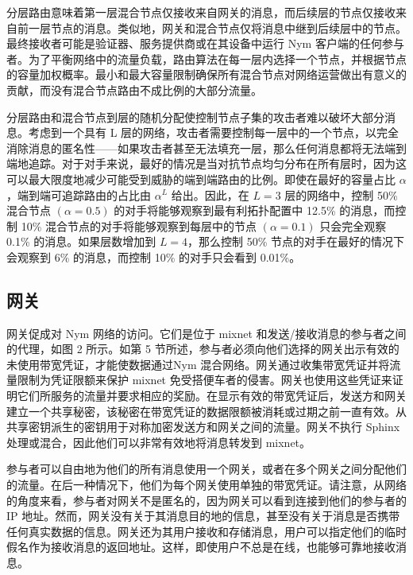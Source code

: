 \documentclass{article}
\begin{document}
	分层路由意味着第一层混合节点仅接收来自网关的消息，而后续层的节点仅接收来自前一层节点的消息。类似地，网关和混合节点仅将消息中继到后续层中的节点。最终接收者可能是验证器、服务提供商或在其设备中运行 Nym 客户端的任何参与者。为了平衡网络中的流量负载，路由算法在每一层内选择一个节点，并根据节点的容量加权概率。最小和最大容量限制确保所有混合节点对网络运营做出有意义的贡献，而没有混合节点路由不成比例的大部分流量。\newline

	分层路由和混合节点到层的随机分配使控制节点子集的攻击者难以破坏大部分消息。考虑到一个具有 L 层的网络，攻击者需要控制每一层中的一个节点，以完全消除消息的匿名性——如果攻击者甚至无法填充一层，那么任何消息都将无法端到端地追踪。对于对手来说，最好的情况是当对抗节点均匀分布在所有层时，因为这可以最大限度地减少可能受到威胁的端到端路由的比例。即使在最好的容量占比 $\alpha$ ，端到端可追踪路由的占比由 $\alpha^L$ 给出。因此，在 $L = 3$ 层的网络中，控制 50\% 混合节点 $(\alpha = 0.5)$ 的对手将能够观察到最有利拓扑配置中 12.5\% 的消息，而控制 10\% 混合节点的对手将能够观察到每层中的节点 $(\alpha = 0.1)$ 只会完全观察 0.1\% 的消息。如果层数增加到 $L = 4$，那么控制 50\% 节点的对手在最好的情况下会观察到 6\% 的消息，而控制 10\% 的对手只会看到 0.01\%。\newline

	\subsection{网关}

	网关促成对 Nym 网络的访问。它们是位于 mixnet 和发送/接收消息的参与者之间的代理，如图 2 所示。如第 5 节所述，参与者必须向他们选择的网关出示有效的未使用带宽凭证，才能使数据通过Nym 混合网络。网关通过收集带宽凭证并将流量限制为凭证限额来保护 mixnet 免受搭便车者的侵害。网关也使用这些凭证来证明它们所服务的流量并要求相应的奖励。在显示有效的带宽凭证后，发送方和网关建立一个共享秘密，该秘密在带宽凭证的数据限额被消耗或过期之前一直有效。从共享密钥派生的密钥用于对称加密发送方和网关之间的流量。网关不执行 Sphinx 处理或混合，因此他们可以非常有效地将消息转发到 mixnet。\newline

	参与者可以自由地为他们的所有消息使用一个网关，或者在多个网关之间分配他们的流量。在后一种情况下，他们为每个网关使用单独的带宽凭证。请注意，从网络的角度来看，参与者对网关不是匿名的，因为网关可以看到连接到他们的参与者的 IP 地址。然而，网关没有关于其消息目的地的信息，甚至没有关于消息是否携带任何真实数据的信息。网关还为其用户接收和存储消息，用户可以指定他们的临时假名作为接收消息的返回地址。这样，即使用户不总是在线，也能够可靠地接收消息。\newline
\end{document}
